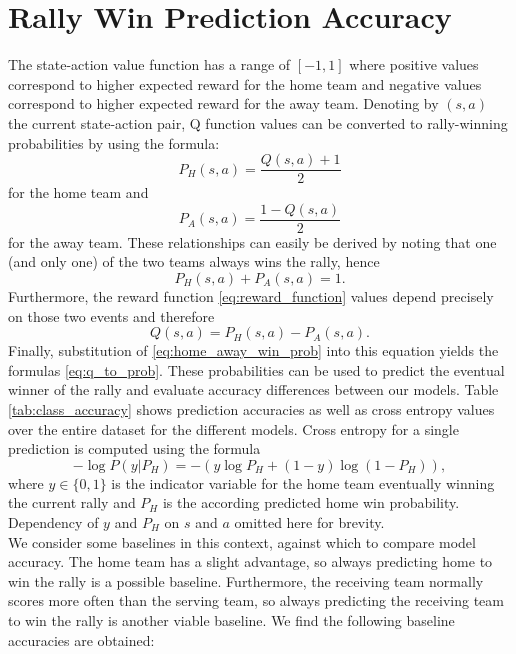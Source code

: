 \documentclass{sfuthesis}
\begin{document}
	\section{Rally Win Prediction Accuracy}
	The state-action value function has a range of $[-1,1]$ where positive values correspond to higher expected reward for the home team and negative values correspond to higher expected reward for the away team. Denoting by $(s,a)$ the current state-action pair, Q function values can be converted to rally-winning probabilities by using the formula:
	\begin{equation}
		P_H(s,a) = \frac{Q(s,a)+1}{2}
		\label{eq:q_to_prob}
	\end{equation}
	for the home team and
	\begin{equation}
		P_A(s,a) = \frac{1-Q(s,a)}{2}
	\end{equation}
	for the away team. These  relationships can easily be derived by noting that one (and only one) of the two teams always wins the rally, hence \begin{equation}
		P_H(s,a) + P_A(s,a) = 1.
		\label{eq:home_away_win_prob}
	\end{equation}
	Furthermore, the reward function  \eqref{eq:reward_function} values depend precisely on those two events and therefore
	$$Q(s,a) = P_H(s,a) - P_A(s,a).$$
	Finally, substitution of \eqref{eq:home_away_win_prob} into this equation yields the formulas \eqref{eq:q_to_prob}. These probabilities can be used to predict the eventual winner of the rally and evaluate accuracy differences between our models. Table \ref{tab:class_accuracy} shows prediction accuracies as well as cross entropy values over the entire dataset for the different models. Cross entropy for a single prediction is computed using the formula
	\begin{equation}
		-\log P(y|P_H) = - (y \log P_H + (1-y) \log(1-P_H)),
	\end{equation}
	where $y \in \{0,1\}$ is the indicator variable for the home team eventually winning the current rally and $P_H$ is the according predicted home win probability. Dependency of $y$ and $P_H$ on $s$ and $a$ omitted here for brevity.\\
	We consider some baselines in this context, against which to compare model accuracy. The home team has a slight advantage, so always predicting home to win the rally is a possible baseline. Furthermore, the receiving team normally scores more often than the serving team, so always predicting the receiving team to win the rally is another viable baseline. We find the following baseline accuracies are obtained:
\end{document}
